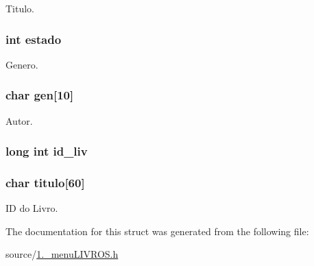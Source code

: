 Titulo. 

\hypertarget{structlivro_a876d08c1d21086e4fd228744da10d028}{
\subsubsection[{estado}]{\setlength{\rightskip}{0pt plus 5cm}int estado}}\label{structlivro_a876d08c1d21086e4fd228744da10d028}


Genero. 

\hypertarget{structlivro_a81b3cc6450c77481974037c3222cb9ff}{
\subsubsection[{gen}]{\setlength{\rightskip}{0pt plus 5cm}char gen\mbox{[}10\mbox{]}}}\label{structlivro_a81b3cc6450c77481974037c3222cb9ff}


Autor. 

\hypertarget{structlivro_a06dd325b1ebe2325328d3d76fae3823a}{
\subsubsection[{id\+\_\+liv}]{\setlength{\rightskip}{0pt plus 5cm}long int id\+\_\+liv}}\label{structlivro_a06dd325b1ebe2325328d3d76fae3823a}
\hypertarget{structlivro_adff70562cca95767369bccf3714e22e9}{
\subsubsection[{titulo}]{\setlength{\rightskip}{0pt plus 5cm}char titulo\mbox{[}60\mbox{]}}}\label{structlivro_adff70562cca95767369bccf3714e22e9}


I\+D do Livro. 



The documentation for this struct was generated from the following file\+:\begin{DoxyCompactItemize}
\item 
source/\hyperlink{1_82__menu_l_i_v_r_o_s_8h}{1.\+\_\+menu\+L\+I\+V\+R\+O\+S.\+h}\end{DoxyCompactItemize}

